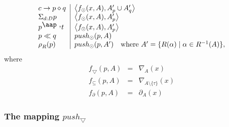 \documentclass{article}
\begin{document}
\[\begin{tabular}{ll}
$c\rightarrow p\diamond q$ & \multicolumn{1}{|l}{$\left\langle f_{\odot
}(x,A),A_{p}^{\prime }\cup A_{q}^{\prime }\right\rangle $} \\ 
$\Sigma _{d:D}p$ & \multicolumn{1}{|l}{$\left\langle f_{\odot
}(x,A),A_{p}^{\prime }\right\rangle $} \\ 
$p^{\mathbin{\mbox{\aap ,}}}t$ & \multicolumn{1}{|l}{$\left\langle f_{\odot
}(x,A),A_{p}^{\prime }\right\rangle $} \\ 
$p\ll q$ & \multicolumn{1}{|l}{$push_{\odot }(p,A)$} \\ 
$\rho _{R}(p)$ & \multicolumn{1}{|l}{$push_{\odot }(p,A^{\prime })\text{
where }A^{\prime }=\{R(\alpha )\mid \alpha \in R^{-1}(A)\},$}%
\end{tabular}%
\]%
where%
\begin{eqnarray*}
f_{\bigtriangledown }(p,A) &=&\nabla _{A}(x) \\
f_{\subseteq }(p,A) &=&\nabla _{A\setminus \{\tau \}}(x) \\
f_{\partial }(p,A) &=&\partial _{A}(x)
\end{eqnarray*}

\newpage

\subsubsection{The mapping $push_{\bigtriangledown }$}
\end{document}
